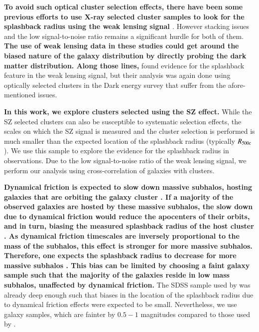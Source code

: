 \documentclass[iop, apjl, twocolappendix, numberedappendix]{emulateapj}
\begin{document}
\textbf{To avoid such optical cluster selection effects, there have been some
previous efforts to use X-ray selected cluster samples to look for the
splashback radius using the weak lensing signal \citep{umetsu2017lensing,
contigiani2018weak}}. However stacking issues and the low signal-to-noise
ratio remains a significant hurdle for both of them. \textbf{The use of weak
lensing data in these studies could get around the biased nature of the galaxy
distribution by directly probing the dark matter distribution. Along those
lines,} \citet{chang2017splashback} found evidence for the splashback feature
in the weak lensing signal, but their analysis was again done using optically
selected clusters in the Dark energy survey that suffer from the
afore-mentioned issues.

\textbf{In this work, we explore clusters selected using the SZ effect.} While
the SZ selected clusters can also be susceptible to systematic selection
effects, the scales on which the SZ signal is measured and the cluster
selection is performed is much smaller than the expected location of the
splashback radius (typically $R_{\rm 500c}$). We use this sample to explore the
evidence for the splashback radius in observations.  Due to the low
signal-to-noise ratio of the weak lensing signal, we perform our analysis using
cross-correlation of galaxies with clusters.

\textbf{Dynamical friction is expected to slow down massive subhalos, hosting
galaxies that are orbiting the galaxy cluster \citep{chandrasekhar1943dynamical}.
If a majority of the observed galaxies are hosted by these massive
subhalos, the slow down due to dynamical friction would reduce the apocenters
of their orbits, and in turn, biasing the measured splashback radius of the host
cluster \citep{more2016detection, diemer2017sparta}. As dynamical
friction timescales are inversely proportional to the mass of the subhalos,
this effect is stronger for more massive subhalos. Therefore, one expects the
splashback radius to decrease for more massive subhalos
\citep{adhikari2016observing}.  This bias can be limited by choosing a faint
galaxy sample such that the majority of the galaxies reside in low mass subhalos,
unaffected by dynamical friction.} The SDSS sample used by
\citet{more2016detection} was already deep enough such that biases in the
location of the splashback radius due to dynamical friction effects were
expected to be small. Nevertheless, we use galaxy samples, which are fainter by
$0.5-1$ magnitudes compared to those used by \citet{more2016detection}.
\end{document}
